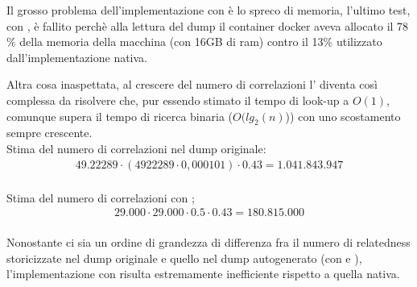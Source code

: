 Il grosso problema dell'implementazione con  è lo spreco di memoria, l'ultimo test, con , è fallito perchè alla lettura del dump il container docker aveva allocato il 
78$\%$ della memoria della macchina (con 16GB di ram) contro il 13$\%$ utilizzato dall'implementazione nativa. 

Altra cosa inaspettata, al crescere del numero di correlazioni l' diventa così complessa da risolvere che, pur essendo stimato il tempo di look-up a $O(1)$, comunque supera il tempo 
di ricerca binaria ($O(lg_2(n)$)) con uno scostamento sempre crescente.\\

Stima del numero di correlazioni nel dump originale: 
\begin{equation}\begin{split}
    49.22289 \cdot (4922289 \cdot 0,000101) \cdot 0.43 = 1.041.843.947\\
\end{split}\end{equation}

Stima del numero di correlazioni con ; 
\begin{equation}\begin{split}
    29.000 \cdot 29.000 \cdot 0.5 \cdot 0.43 = 180.815.000 \\
\end{split}\end{equation}

Nonostante ci sia un ordine di grandezza di differenza fra il numero di relatedness storicizzate nel dump originale e quello nel dump autogenerato (con  e ), 
l'implementazione con  risulta estremamente inefficiente rispetto a quella nativa. 